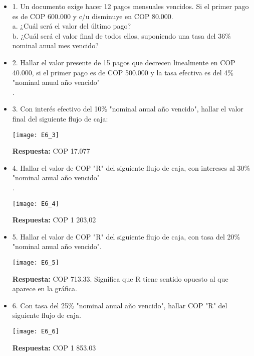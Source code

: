 \begin{itemize}
 \item 1. Un documento exige hacer 12 pagos mensuales vencidos. Si el primer pago es de COP 600.000 y c/u disminuye en COP 80.000.\\
       a. ¿Cuál será el valor del último pago?\\
       b. ¿Cuál será el valor final de todos ellos, suponiendo una tasa del 36\% nominal anual mes vencido?\\
       \medskip

 \item 2. Hallar el valor presente de 15 pagos que decrecen linealmente en COP 40.000, si el primer pago es de COP 500.000 y la tasa efectiva es del 4\% "nominal anual año vencido"\\.
       \medskip

 \item 3. Con interés efectivo del 10\% "nominal anual año vencido", hallar el valor final del siguiente flujo de caja:\\
       \begin{center}
        \texttt{[image: E6\_3]}
       \end{center}
       \textbf{Respuesta:} COP 17.077\\
       \medskip

 \item 4. Hallar el valor de  COP  "R" del siguiente flujo de caja, con intereses al 30\% "nominal anual año vencido"\\.
       \begin{center}
        \texttt{[image: E6\_4]}
       \end{center}
       \textbf{Respuesta:} COP 1 203,02\\
       \medskip

 \item 5. Hallar el valor de  COP  "R" del siguiente flujo de caja, con tasa del 20\% "nominal anual año vencido".
       \begin{center}
        \texttt{[image: E6\_5]}
       \end{center}
       \textbf{Respuesta:} COP 713.33. Significa que R tiene sentido opuesto al que aparece en la gráfica.\\
       \medskip

 \item 6. Con tasa del 25\% "nominal anual año vencido", hallar  COP  "R" del siguiente flujo de caja.
       \begin{center}
        \texttt{[image: E6\_6]}
       \end{center}
       \textbf{Respuesta:} COP 1 853.03\\
       \medskip


\end{itemize}

